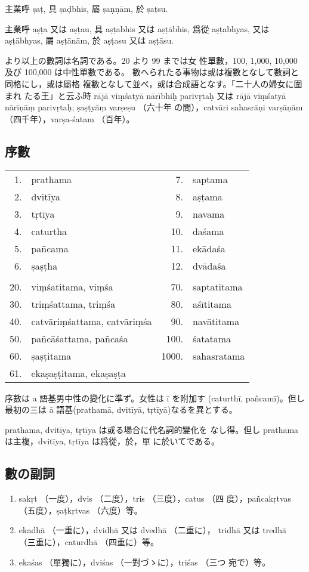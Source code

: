 主業呼 ṣaṭ, 具 ṣaḍbhis, 屬 ṣaṇṇām, 於 ṣaṭsu.

主業呼 aṣṭa 又は aṣṭau, 具 aṣṭabhis 又は aṣṭābhis, 爲從
aṣṭabhyas, 又は aṣṭābhyas, 屬 aṣṭānām, 於 aṣṭasu 又は
aṣṭāsu.

 より以上の數詞は名詞である。20 より 99 までは女
性單數，100, 1,000, 10,000 及び 100,000 は中性單數である。
數へられたる事物は或は複數となして數詞と同格にし，或は屬格
複數となして並べ，或は合成語となす。「二十人の婦女に圍まれ
たる王」と云ふ時 rājā viṃśatyā nārībhiḥ parivṛtaḥ 又は
rājā viṃśatyā nārīṇāṃ parivṛtaḥ; ṣaṣṭyāṃ varṣeṣu （六十年
の間），catvāri sahasrāṇi varṣāṇām （四千年），varṣa-śatam
（百年）。

\subsection{序數}
\numberParagraph
\begin{longtable}{rlrl}
 1. & prathama &  7. & saptama \\
 2. & dvitīya  &  8. & aṣṭama \\
 3. & tṛtīya   &  9. & navama \\
 4. & caturtha & 10. & daśama \\
 5. & pañcama  & 11. & ekādaśa \\
 6. & ṣaṣṭha   & 12. & dvādaśa \\
\\
20. & viṃśatitama, viṃśa          &   70. & saptatitama \\
30. & triṃśattama, triṃśa         &   80. & aśītitama \\
40. & catvāriṃśattama, catvāriṃśa &   90. & navātitama \\
50. & pañcāśattama, pañcaśa       &  100. & śatatama \\
60. & ṣaṣṭitama                   & 1000. & sahasratama \\
61. & ekaṣaṣṭitama, ekaṣaṣṭa      &       & \\
\end{longtable}

\numberParagraph
序數は a 語基男中性の變化に準ず。女性は ī を附加す
(caturthī, pañcamī)。但し最初の三は ā 語基(prathamā,
dvitīyā, tṛtīyā)なるを異とする。

\numberParagraph
prathama, dvitīya, tṛtīya は或る場合に代名詞的變化を
なし得。但し prathama は主複，dvitīya, tṛtīya は爲從，於，單
に於いてである。

\subsection{數の副詞}
\numberParagraph \label{np:118}
\begin{enumerate}[label=(\alph*)]
\item sakṛt （一度），dvis （二度），tris （三度），catus （四
度），pañcakṛtvas （五度），ṣaṭkṛtvas （六度）等。
\item ekadhā （一重に），dvidhā 又は dvedhā （二重に），
tridhā 又は tredhā （三重に），caturdhā （四重に）等。
\item ekaśas （單獨に），dviśas （一對づゝに），triśas （三つ
宛で）等。
\end{enumerate}


